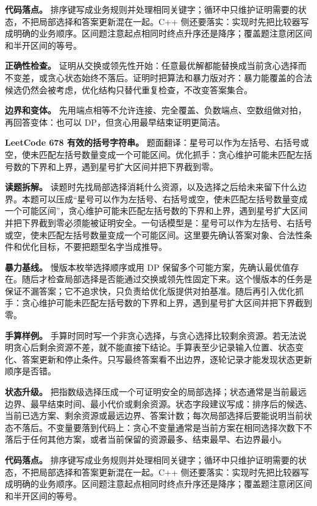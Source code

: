 \textbf{代码落点。} 排序键写成业务规则并处理相同关键字；循环中只维护证明需要的状态，不把局部选择和答案更新混在一起。C++ 侧还要落实：实现时先把比较器写成明确的业务顺序。区间题注意起点相同时终点升序还是降序；覆盖题注意闭区间和半开区间的等号。

\textbf{正确性检查。} 证明从交换或领先性开始：任意最优解都能替换成当前贪心选择而不变差，或贪心状态始终不落后。证明时把算法和暴力版对齐：暴力能覆盖的合法候选仍然会被考虑，优化结构只替代重复检查，不改变答案集合。

\textbf{边界和变体。} 先用端点相等不允许连接、完全覆盖、负数端点、空数组做对拍，再回答变体：也可以 DP，但贪心用最早结束证明更简洁。

\noindent\textbf{LeetCode 678 有效的括号字符串。} 题面翻译：星号可以作为左括号、右括号或空，使未匹配左括号数量变成一个可能区间。优化抓手：贪心维护可能未匹配左括号数的下界和上界，遇到星号扩大区间并把下界截到零。

\textbf{读题拆解。} 读题时先找局部选择消耗什么资源，以及选择之后给未来留下什么边界。本题可以压成“星号可以作为左括号、右括号或空，使未匹配左括号数量变成一个可能区间”，贪心维护可能未匹配左括号数的下界和上界，遇到星号扩大区间并把下界截到零必须能被证明安全。一句话模型是：星号可以作为左括号、右括号或空，使未匹配左括号数量变成一个可能区间。这里要先确认答案对象、合法性条件和优化目标，不要把题型名字当成推导。

\textbf{暴力基线。} 慢版本枚举选择顺序或用 DP 保留多个可能方案，先确认最优值存在。随后才检查局部选择是否能通过交换或领先性固定下来。这个慢版本的任务是保证不漏答案；它不追求快，只负责给优化版提供对拍基准。随后再引入优化抓手：贪心维护可能未匹配左括号数的下界和上界，遇到星号扩大区间并把下界截到零。

\textbf{手算样例。} 手算时同时写一个非贪心选择，与贪心选择比较剩余资源。若无法说明贪心后剩余资源不差，就不能直接下结论。手算表至少记录输入位置、状态变化、答案更新和停止条件。只写最终答案看不出边界，逐轮记录才能发现状态更新顺序是否错。

\textbf{状态升级。} 把指数级选择压成一个可证明安全的局部选择；状态通常是当前最远边界、最早结束时间、最小代价或剩余资源。状态字段建议写成：排序后的候选、当前已选方案、剩余资源或最远边界、答案计数；每次局部选择后要能说明当前状态不落后。不变量要落到代码上：贪心不变量通常是当前方案在相同选择次数下不落后于任何其他方案，或者当前保留的资源最多、结束最早、右边界最小。

\textbf{代码落点。} 排序键写成业务规则并处理相同关键字；循环中只维护证明需要的状态，不把局部选择和答案更新混在一起。C++ 侧还要落实：实现时先把比较器写成明确的业务顺序。区间题注意起点相同时终点升序还是降序；覆盖题注意闭区间和半开区间的等号。

